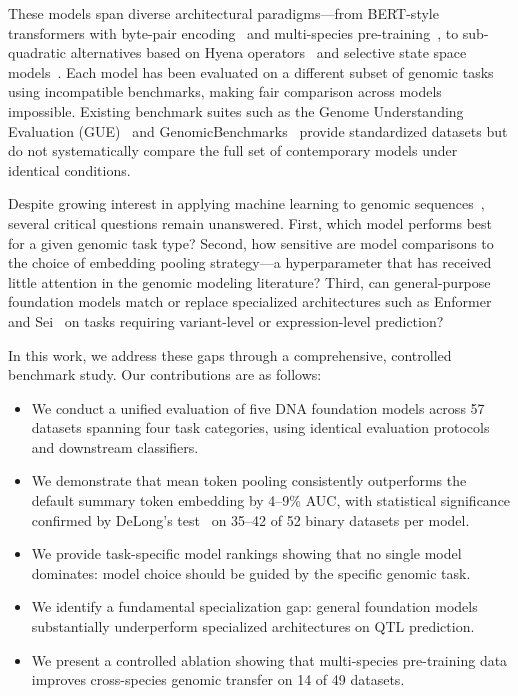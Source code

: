 \documentclass{article}
\begin{document}
These models span diverse architectural paradigms---from BERT-style transformers
with byte-pair encoding~\citep{zhou_2024_dnabert2, sennrich_2016_bpe} and
multi-species pre-training~\citep{dallatorre_2024_nucleotide}, to sub-quadratic
alternatives based on Hyena operators~\citep{nguyen_2023_hyenadna,
poli_2023_hyena} and selective state space models~\citep{schiff_2024_caduceus,
gu_2024_mamba}. Each model has been evaluated on a different subset of genomic
tasks using incompatible benchmarks, making fair comparison across models
impossible. Existing benchmark suites such as the Genome Understanding Evaluation
(GUE)~\citep{zhou_2024_dnabert2} and
GenomicBenchmarks~\citep{gresova_2023_genomicbenchmarks} provide standardized
datasets but do not systematically compare the full set of contemporary models
under identical conditions.

Despite growing interest in applying machine learning to genomic
sequences~\citep{ji_2021_survey_dna_ml}, several critical questions remain
unanswered. First, which model performs best
for a given genomic task type? Second, how sensitive are model comparisons to the
choice of embedding pooling strategy---a hyperparameter that has received little
attention in the genomic modeling literature? Third, can general-purpose
foundation models match or replace specialized architectures such as
Enformer~\citep{avsec_2021_enformer} and Sei~\citep{chen_2022_sei} on tasks
requiring variant-level or expression-level prediction?

In this work, we address these gaps through a comprehensive, controlled benchmark
study. Our contributions are as follows:
\begin{itemize}
\item We conduct a unified evaluation of five DNA foundation models across 57
      datasets spanning four task categories, using identical evaluation protocols
      and downstream classifiers.
\item We demonstrate that mean token pooling consistently outperforms the default
      summary token embedding by 4--9\% AUC, with statistical significance
      confirmed by DeLong's test~\citep{delong_1988_comparing} on 35--42 of 52
      binary datasets per model.
\item We provide task-specific model rankings showing that no single model
      dominates: model choice should be guided by the specific genomic task.
\item We identify a fundamental specialization gap: general foundation models
      substantially underperform specialized architectures on QTL prediction.
\item We present a controlled ablation showing that multi-species pre-training
      data improves cross-species genomic transfer on 14 of 49 datasets.
\end{itemize}
\end{document}
